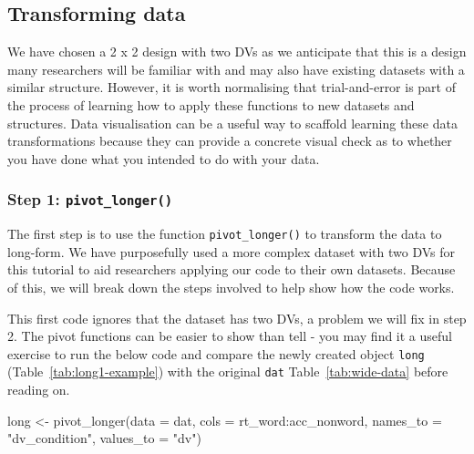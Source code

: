 \documentclass[
  english,
  doc,floatsintext]{apa6}
\newenvironment{Shaded}{\begin{snugshade}}{\end{snugshade}}
\newcommand{\AttributeTok}[1]{\textcolor[rgb]{0.77,0.63,0.00}{#1}}
\newcommand{\FunctionTok}[1]{\textcolor[rgb]{0.00,0.00,0.00}{#1}}
\newcommand{\NormalTok}[1]{#1}
\newcommand{\OtherTok}[1]{\textcolor[rgb]{0.56,0.35,0.01}{#1}}
\newcommand{\SpecialCharTok}[1]{\textcolor[rgb]{0.00,0.00,0.00}{#1}}
\newcommand{\StringTok}[1]{\textcolor[rgb]{0.31,0.60,0.02}{#1}}
\begin{document}
\hypertarget{transforming-data-1}{%
\subsection{Transforming data}\label{transforming-data-1}}

We have chosen a 2 x 2 design with two DVs as we anticipate that this is a design many researchers will be familiar with and may also have existing datasets with a similar structure. However, it is worth normalising that trial-and-error is part of the process of learning how to apply these functions to new datasets and structures. Data visualisation can be a useful way to scaffold learning these data transformations because they can provide a concrete visual check as to whether you have done what you intended to do with your data.

\hypertarget{step-1-pivot_longer}{%
\subsubsection{\texorpdfstring{Step 1: \texttt{pivot\_longer()}}{Step 1: pivot\_longer()}}\label{step-1-pivot_longer}}

The first step is to use the function \texttt{pivot\_longer()} to transform the data to long-form. We have purposefully used a more complex dataset with two DVs for this tutorial to aid researchers applying our code to their own datasets. Because of this, we will break down the steps involved to help show how the code works.

This first code ignores that the dataset has two DVs, a problem we will fix in step 2. The pivot functions can be easier to show than tell - you may find it a useful exercise to run the below code and compare the newly created object \texttt{long} (Table~\ref{tab:long1-example}) with the original \texttt{dat} Table~\ref{tab:wide-data} before reading on.

\begin{Shaded}
\begin{Highlighting}[]
\NormalTok{long }\OtherTok{\textless{}{-}} \FunctionTok{pivot\_longer}\NormalTok{(}\AttributeTok{data =}\NormalTok{ dat, }
                     \AttributeTok{cols =}\NormalTok{ rt\_word}\SpecialCharTok{:}\NormalTok{acc\_nonword, }
                     \AttributeTok{names\_to =} \StringTok{"dv\_condition"}\NormalTok{,}
                     \AttributeTok{values\_to =} \StringTok{"dv"}\NormalTok{)}
\end{Highlighting}
\end{Shaded}
\end{document}

